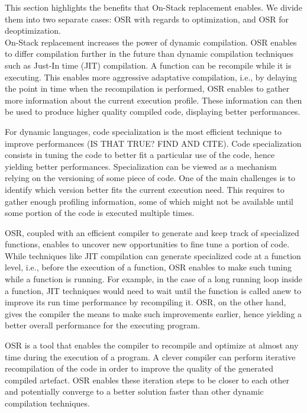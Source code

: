 This section highlights the benefits that On-Stack replacement enables.
We divide them into two separate cases: OSR with regards to optimization, and OSR for deoptimization.\\

On-Stack replacement increases the power of dynamic compilation.
OSR enables to differ compilation further in the future than dynamic compilation techniques such as Just-In time (JIT) compilation.
A function can be recompile while it is executing.
This enables more aggressive adaptative compilation, i.e., by delaying the point in time when the recompilation is performed, OSR enables to gather more information about the current execution profile. These information can then be used to produce higher quality compiled code, displaying better performances.

For dynamic languages, code specialization is the most efficient technique to improve performances (IS THAT TRUE? FIND AND CITE).
Code specialization consists in tuning the code to better fit a particular use of the code, hence yielding better performances.
Specialization can be viewed as a mechanism relying on the versioning of some piece of code.
One of the main challenges is to identify which version better fits the current execution need.
This requires to gather enough profiling information, some of which might not be available until some portion of the code is executed multiple times.

OSR, coupled with an efficient compiler to generate and keep track of specialized functions, enables to uncover new opportunities to fine tune a portion of code.
While techniques like JIT compilation can generate specialized code at a function level, i.e., before the execution of a function, OSR enables to make such tuning while a function is running.
For example, in the case of a long running loop inside a function, JIT techniques would need to wait until the function is called anew to improve its run time performance by recompiling it. 
OSR, on the other hand, gives the compiler the means to make such improvements earlier, hence yielding a better overall performance for the executing program.

OSR is a tool that enables the compiler to recompile and optimize at almost any time during the execution of a program.
A clever compiler can perform iterative recompilation of the code in order to improve the quality of the generated compiled artefact.
OSR enables these iteration steps to be closer to each other and potentially converge to a better solution faster than other dynamic compilation techniques.\\

